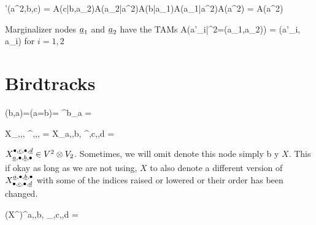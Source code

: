 \beq
\calq'(a^2,b,c)
=
A(c|b,a_2)A(a_2|a^2)A(b|a_1)A(a_1|a^2)A(a^2)
=
\bcen
{}
\ecen
A(a^2)
\eeq

Marginalizer nodes  $\rva_1$ and $\rva_2$
have the TAMs
\beq \color{blue}
A(a'_i|\rva^2=(a_1,a_2)) = \delta(a'_i, a_i)
\eeq
for $i=1,2$

\section{Birdtracks}

\beq
\delta(b,a)=\indi(a=b)=
\delta^b_a =
\eeq


\beq
{}
X_{\rva,\bullet,\rvb, \bullet}^{\bullet,\rvc,\bullet,\rvd}
=
X_{a,\bullet,b, \bullet}^{\bullet,c,\bullet,d}
=
\bcen
{}\ecen
\eeq

\beq
\bcen
{}\ecen
\rarrow
\bcen
{}\ecen
\eeq
$X_{\rva,\bullet,\rvb, \bullet}
^{\bullet,\rvc,\bullet,\rvd}\in V^2 \otimes V_2$.
Sometimes, 
we will omit denote
this node simply b y $X$.
This if okay as long as
we are not using,
$X$ to also denote
a different version of $X^{\rva,\bullet,\rvb, \bullet}
_{\bullet,\rvc,\bullet,\rvd}$
with some of the indices
raised or lowered or 
their order has been changed.

\beq
(X^\dagger)^{a,\bullet,b, \bullet}_{\bullet,c,\bullet,d}
=
\bcen
{}\ecen
\eeq


